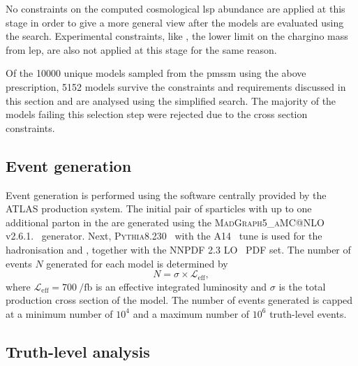 No constraints on the computed cosmological \gls{lsp} abundance are applied at this stage in order to give a more general view after the models are evaluated using the \onelepton search. Experimental constraints, like \eg, the lower limit on the chargino mass from \gls{lep}, are also not applied at this stage for the same reason. 

Of the \num[group-separator={,}]{10000} unique models sampled from the \gls{pmssm} using the above prescription, \num[group-separator={,}]{5152} models survive the constraints and requirements discussed in this section and are analysed using the simplified \onelepton search. The majority of the models failing this selection step were rejected due to the cross section constraints.

\subsection{Event generation}

Event generation is performed using the software centrally provided by the ATLAS production system. The initial pair of sparticles with up to one additional parton in the  are generated using the \textsc{MadGraph5\_aMC@NLO} v2.6.1.~\cite{MGaMCNLO:2014hca,Frederix:2012ps} generator. Next, \textsc{Pythia8.230}~\cite{Pythia8:2007gs}  with the \textsc{A14}~\cite{ATL-PHYS-PUB-2014-021} tune is used for the hadronisation and , together with the NNPDF 2.3 LO~\cite{Ball:2012cx} \gls{PDF} set. The number of events $N$ generated for each model is determined by
\begin{equation}
	N = \sigma \times \mathcal{L}_\mathrm{eff},
\end{equation}
where $\mathcal{L}_\mathrm{eff} = \SI{700}{\per\femto\barn}$ is an effective integrated luminosity and $\sigma$ is the total production cross section of the model. The number of events generated is capped at a minimum number of $10^4$ and a maximum number of $10^6$ truth-level events.

\subsection{Truth-level analysis}

